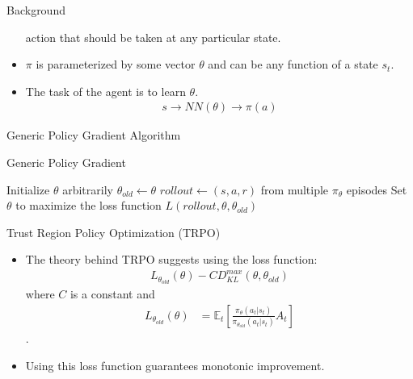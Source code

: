 \documentclass{beamer}
\begin{document}
\begin{frame}{Background}
\begin{itemize}
            action that should be taken at any particular state.
        \item $\pi$ is parameterized by some vector $\theta$ and can be any
            function of a state $s_t$.
        \item The task of the agent is to learn $\theta$.
        \begin{align*}
            s \rightarrow NN(\theta) \rightarrow \pi(a)
        \end{align*}
    \end{itemize}
    \framebreak
    Generic Policy Gradient Algorithm
    \begin{algorithm}[H]
        \caption{Generic Policy Gradient}
        \begin{algorithmic}
            \State Initialize $\theta$ arbitrarily
                \State $\theta_{old} \gets \theta$
                \State $rollout \gets (s, a, r)$ from multiple
                $\pi_{\theta}$ episodes 
                \State Set $\theta$ to maximize the loss function $L(rollout,
                \theta, \theta_{old})$
            \EndWhile
        \end{algorithmic}
    \end{algorithm}
    \framebreak
    Trust Region Policy Optimization (TRPO)
    \begin{itemize}
        \item The theory behind TRPO suggests using the loss function:
        \begin{align*}
            L_{\theta_{old}}(\theta) 
            - CD_{KL}^{max}(\theta, \theta_{old})
        \end{align*}
        where $C$ is a constant and
        \begin{align*}
            L_{\theta_{old}}(\theta) &=
            \mathbb{E}_t \left[ 
            \frac
            {\pi_{\theta}(a_t | s_t)}
            {\pi_{\theta_{old}} (a_t | s_t)}
            A_t
            \right]
        \end{align*}.
        \item Using this loss function guarantees monotonic improvement.

\end{itemize}
\end{frame}
\end{document}
